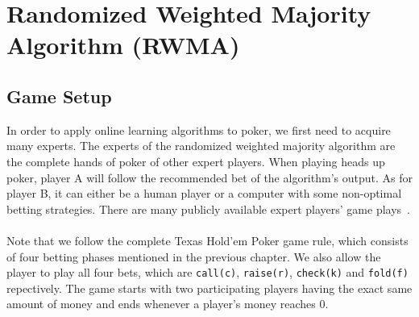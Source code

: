 \documentclass[12pt]{article}
\begin{document}
\section{Randomized Weighted Majority Algorithm (RWMA)}
\subsection{Game Setup}
In order to apply online learning algorithms to poker, we first need to acquire many experts. The experts of the randomized weighted majority algorithm are the complete hands of poker of other expert players. When playing heads up poker, player A will follow the recommended bet of the algorithm's output. As for player B, it can either be a human player or a computer with some non-optimal betting strategies. There are many publicly available expert players' game plays~\cite{experts}.\\
\\
Note that we follow the complete Texas Hold'em Poker game rule, which consists of four betting phases mentioned in the previous chapter. We also allow the player to play all four bets, which are \texttt{call(c)}, \texttt{raise(r)}, \texttt{check(k)} and \texttt{fold(f)} repectively. The game starts with two participating players having the exact same amount of money and ends whenever a player's money reaches 0.
\end{document}

